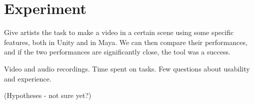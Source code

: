 \section{Experiment}
Give artists the task to make a video in a certain scene using some specific features, both in Unity and in Maya. We can then compare their performances, and if the two performances are significantly close, the tool was a success.

Video and audio recordings. Time spent on tasks. Few questions about usability and experience.

(Hypotheses - not sure yet?)
